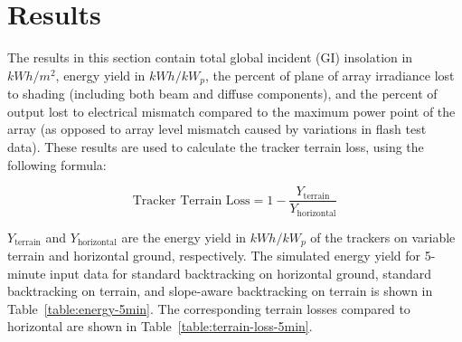 \documentclass[conference]{IEEEtran}
\begin{document}
\section{Results}

The results in this section contain total global incident (GI) insolation in $kWh/m^2$, energy yield in $kWh/kW_p$, the percent of plane of array irradiance lost to shading (including both beam and diffuse components), and the percent of output lost to electrical mismatch compared to the maximum power point of the array (as opposed to array level mismatch caused by variations in flash test data). These results are used to calculate the tracker terrain loss, using the following formula:

\begin{equation}
\text{Tracker Terrain Loss} = 1 - \frac{Y_\text{terrain}}{Y_\text{horizontal}}\label{eq:tracker-terrain-loss}
\end{equation}

$Y_\text{terrain}$ and $Y_\text{horizontal}$ are the energy yield in $kWh/kW_p$ of the trackers on variable terrain and horizontal ground, respectively. The simulated energy yield for 5-minute input data for standard backtracking on horizontal ground, standard backtracking on terrain, and slope-aware backtracking on terrain is shown in Table~\ref{table:energy-5min}. The corresponding terrain losses compared to horizontal are shown in Table~\ref{table:terrain-loss-5min}.
\end{document}
